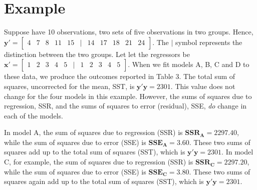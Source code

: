 \documentclass[11pt, oneside]{article}   	%
\begin{document}
\section{Example}
Suppose have 10 observations, two sets of five observations in two groups. Hence, \(\mathbf{y'} = \left[ \begin{array}{ccccccccccc}4 & 7 & 8 & 11 & 15 & | & 14 & 17 & 18 & 21 & 24  \end{array} \right]\).  The $ | $ symbol represents the distinction between the two groups. Let let the regressors be \(\mathbf{x'} = \left[ \begin{array}{ccccccccccc}1 & 2 & 3 & 4 & 5 & | & 1 & 2 & 3 & 4 & 5  \end{array} \right]\).  When we fit models A, B, C and D to these data, we produce the outcomes reported in Table 3. The total sum of squares, uncorrected for the mean, SST, is $  \mathbf{y} ' \mathbf{y} = 2301  $.  This value does not change for the four models in this example.  However, the sums of squares due to regression, SSR, and the sums of squares to error (residual), SSE, \emph{do} change in each of the models.       
\bigskip
\vspace{2 mm}

In model A, the sum of squares due to regression (SSR) is $ \mathbf{SSR_{A}} = 2297.40 $, while the sum of squares due to error (SSE) is $ \mathbf{SSE_{A}} = 3.60 $. These two sums of squares add up to the total sum of squares (SST), which is  $ \mathbf{y'y} = 2301.  $  In model C, for example, the sum of squares due to regression (SSR) is $ \mathbf{SSR_{C}} = 2297.20 $, while the sum of squares due to error (SSE) is $ \mathbf{SSE_{C}} = 3.80 $. These two sums of squares again add up to the total sum of squares (SST), which is  $ \mathbf{y'y} = 2301.  $  

\bigskip
\end{document}
